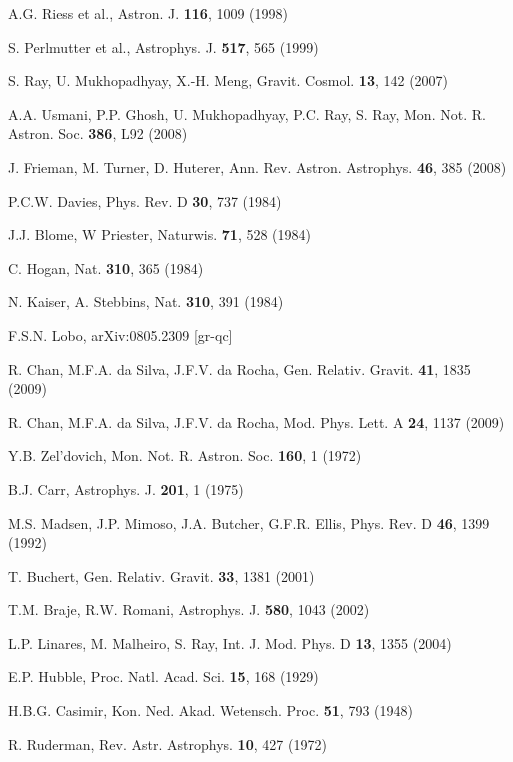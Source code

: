 \documentclass[preprint,12pt]{elsarticle}
\begin{document}
\begin{thebibliography}{99}
 A.G. Riess et al., Astron. J. \textbf{116}, 1009 (1998)

 S. Perlmutter et al., Astrophys. J. \textbf{517}, 565 (1999)

 S. Ray, U. Mukhopadhyay, X.-H. Meng, Gravit. Cosmol. \textbf{13}, 142 (2007)

 A.A. Usmani, P.P. Ghosh, U. Mukhopadhyay, P.C. Ray, S. Ray, Mon. Not. R. Astron. Soc. \textbf{386}, L92 (2008)

 J. Frieman, M. Turner, D. Huterer, Ann. Rev. Astron. Astrophys. \textbf{46}, 385 (2008)

 P.C.W. Davies, Phys. Rev. D \textbf{30}, 737 (1984)

 J.J. Blome, W Priester, Naturwis. \textbf{71}, 528 (1984)

 C. Hogan, Nat. \textbf{310}, 365 (1984)

 N. Kaiser, A. Stebbins, Nat. \textbf{310}, 391 (1984)

 F.S.N. Lobo, arXiv:0805.2309 [gr-qc]

 R. Chan, M.F.A. da Silva, J.F.V. da Rocha, Gen. Relativ. Gravit. \textbf{41}, 1835 (2009)

 R. Chan, M.F.A. da Silva, J.F.V. da Rocha, Mod. Phys. Lett. A \textbf{24}, 1137 (2009)

 Y.B. Zel'dovich, Mon. Not. R. Astron. Soc. \textbf{160}, 1 (1972)

 B.J. Carr, Astrophys. J. \textbf{201}, 1 (1975)

 M.S. Madsen, J.P. Mimoso, J.A. Butcher, G.F.R. Ellis, Phys. Rev. D \textbf{46}, 1399 (1992)

 T. Buchert, Gen. Relativ. Gravit. \textbf{33}, 1381 (2001)

 T.M. Braje, R.W. Romani, Astrophys. J. \textbf{580}, 1043 (2002)

 L.P. Linares, M. Malheiro, S. Ray, Int. J. Mod. Phys. D \textbf{13}, 1355 (2004)

 E.P. Hubble,  Proc. Natl. Acad. Sci. \textbf{15}, 168 (1929)

 H.B.G. Casimir, Kon. Ned. Akad. Wetensch. Proc. \textbf{51}, 793 (1948)

  R. Ruderman, Rev. Astr. Astrophys. \textbf{10}, 427 (1972)


\end{thebibliography}
\end{document}
